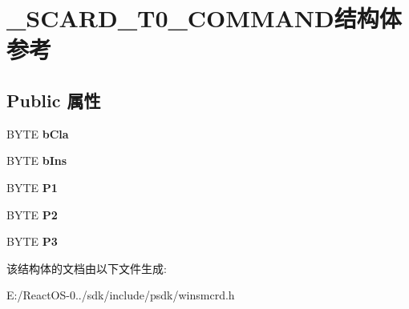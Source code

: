 \hypertarget{struct___s_c_a_r_d___t0___c_o_m_m_a_n_d}{}\section{\+\_\+\+S\+C\+A\+R\+D\+\_\+\+T0\+\_\+\+C\+O\+M\+M\+A\+N\+D结构体 参考}
\label{struct___s_c_a_r_d___t0___c_o_m_m_a_n_d}
\subsection*{Public 属性}
\begin{DoxyCompactItemize}
\item 
\mbox{\label{struct___s_c_a_r_d___t0___c_o_m_m_a_n_d_a61476c4979093cbd77a05e57192df6d5}} 
B\+Y\+TE {\bfseries b\+Cla}
\item 
\mbox{\label{struct___s_c_a_r_d___t0___c_o_m_m_a_n_d_ac815b1fa281c23b3223199df51dfe996}} 
B\+Y\+TE {\bfseries b\+Ins}
\item 
\mbox{\label{struct___s_c_a_r_d___t0___c_o_m_m_a_n_d_a74fdfd99ba781a7a2ae725873751506b}} 
B\+Y\+TE {\bfseries P1}
\item 
\mbox{\label{struct___s_c_a_r_d___t0___c_o_m_m_a_n_d_ae4381942e4f07af296d7f5d6a65a70f2}} 
B\+Y\+TE {\bfseries P2}
\item 
\mbox{\label{struct___s_c_a_r_d___t0___c_o_m_m_a_n_d_a636da9b62404b6a95120000282843c62}} 
B\+Y\+TE {\bfseries P3}
\end{DoxyCompactItemize}


该结构体的文档由以下文件生成\+:\begin{DoxyCompactItemize}
\item 
E\+:/\+React\+O\+S-\/0../sdk/include/psdk/winsmcrd.\+h\end{DoxyCompactItemize}
